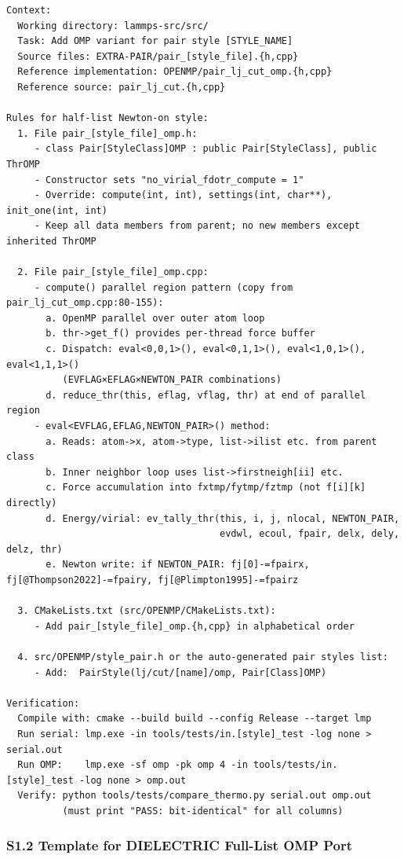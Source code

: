 \documentclass[
  11pt,
]{article}
\newcounter{none} %
\begin{document}
\begin{verbatim}
Context:
  Working directory: lammps-src/src/
  Task: Add OMP variant for pair style [STYLE_NAME]
  Source files: EXTRA-PAIR/pair_[style_file].{h,cpp}
  Reference implementation: OPENMP/pair_lj_cut_omp.{h,cpp}
  Reference source: pair_lj_cut.{h,cpp}

Rules for half-list Newton-on style:
  1. File pair_[style_file]_omp.h:
     - class Pair[StyleClass]OMP : public Pair[StyleClass], public ThrOMP
     - Constructor sets "no_virial_fdotr_compute = 1"
     - Override: compute(int, int), settings(int, char**), init_one(int, int)
     - Keep all data members from parent; no new members except inherited ThrOMP

  2. File pair_[style_file]_omp.cpp:
     - compute() parallel region pattern (copy from pair_lj_cut_omp.cpp:80-155):
       a. OpenMP parallel over outer atom loop
       b. thr->get_f() provides per-thread force buffer
       c. Dispatch: eval<0,0,1>(), eval<0,1,1>(), eval<1,0,1>(), eval<1,1,1>()
          (EVFLAG×EFLAG×NEWTON_PAIR combinations)
       d. reduce_thr(this, eflag, vflag, thr) at end of parallel region
     - eval<EVFLAG,EFLAG,NEWTON_PAIR>() method:
       a. Reads: atom->x, atom->type, list->ilist etc. from parent class
       b. Inner neighbor loop uses list->firstneigh[ii] etc.
       c. Force accumulation into fxtmp/fytmp/fztmp (not f[i][k] directly)
       d. Energy/virial: ev_tally_thr(this, i, j, nlocal, NEWTON_PAIR,
                                      evdwl, ecoul, fpair, delx, dely, delz, thr)
       e. Newton write: if NEWTON_PAIR: fj[0]-=fpairx, fj[@Thompson2022]-=fpairy, fj[@Plimpton1995]-=fpairz
  
  3. CMakeLists.txt (src/OPENMP/CMakeLists.txt):
     - Add pair_[style_file]_omp.{h,cpp} in alphabetical order
  
  4. src/OPENMP/style_pair.h or the auto-generated pair styles list:
     - Add:  PairStyle(lj/cut/[name]/omp, Pair[Class]OMP)

Verification:
  Compile with: cmake --build build --config Release --target lmp
  Run serial: lmp.exe -in tools/tests/in.[style]_test -log none > serial.out
  Run OMP:    lmp.exe -sf omp -pk omp 4 -in tools/tests/in.[style]_test -log none > omp.out
  Verify: python tools/tests/compare_thermo.py serial.out omp.out
          (must print "PASS: bit-identical" for all columns)
\end{verbatim}

\subsubsection{S1.2 Template for DIELECTRIC Full-List OMP
Port}\label{s1.2-template-for-dielectric-full-list-omp-port}
\end{document}
